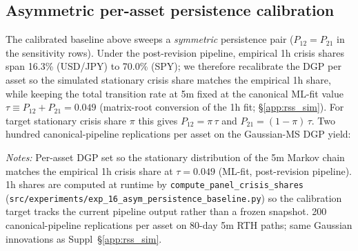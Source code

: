 \documentclass[preprint,12pt,authoryear]{elsarticle}
\begin{document}
\subsection{Asymmetric per-asset persistence calibration}\label{app:asym_baseline}
The calibrated baseline above sweeps a \emph{symmetric} persistence pair ($P_{12}=P_{21}$ in the sensitivity rows). Under the post-revision pipeline, empirical 1h crisis shares span 16.3\% (USD/JPY) to 70.0\% (SPY); we therefore recalibrate the DGP per asset so the simulated stationary crisis share matches the empirical 1h share, while keeping the total transition rate at 5m fixed at the canonical ML-fit value $\tau \equiv P_{12}+P_{21} = 0.049$ (matrix-root conversion of the 1h fit; \S\ref{app:rss_sim}). For target stationary crisis share $\pi$ this gives $P_{12}=\pi\,\tau$ and $P_{21}=(1-\pi)\,\tau$. Two hundred canonical-pipeline replications per asset on the Gaussian-MS DGP yield:

\begin{table}[H]
\centering
\small
\setlength{\tabcolsep}{4pt}
\caption{Asymmetric-persistence Gaussian-MS baseline calibrated to per-asset 1h crisis shares ($\tau=0.049$ ML-fit). Shares are computed at runtime from the post-revision pipeline (\texttt{outputs/simulation\_rss\_asym\_persistence\_1h\_anchor.csv}).}
\label{tab:asym_baseline}
\par\medskip
{\footnotesize\justifying
\textit{Notes:} Per-asset DGP set so the stationary distribution of the 5m Markov chain matches the empirical 1h crisis share at $\tau=0.049$ (ML-fit, post-revision pipeline). 1h shares are computed at runtime by \texttt{compute\_panel\_crisis\_shares} (\texttt{src/experiments/exp\_16\_asym\_persistence\_baseline.py}) so the calibration target tracks the current pipeline output rather than a frozen snapshot. 200 canonical-pipeline replications per asset on 80-day 5m RTH paths; same Gaussian innovations as Suppl~\S\ref{app:rss_sim}.
\par}
\end{table}
\end{document}
